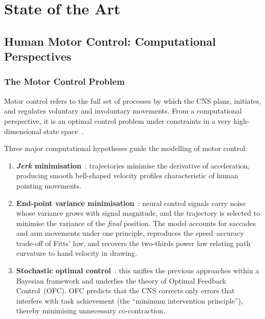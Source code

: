 \chapter{State of the Art}
\label{chap:sota}

\section{Human Motor Control: Computational Perspectives}

\subsection{The Motor Control Problem}

Motor control refers to the full set of processes by which the CNS plans,
initiates, and regulates voluntary and involuntary movements. From a computational
perspective, it is an optimal control problem under constraints in a very high-
dimensional state space~\parencite{Todorov2004, Scott2004}.

Three major computational hypotheses guide the modelling of motor control:
\begin{enumerate}
  \item \textbf{\textit{Jerk} minimisation}~\parencite{Flash1985}: trajectories
        minimise the derivative of acceleration, producing smooth bell-shaped
        velocity profiles characteristic of human pointing movements.
  \item \textbf{End-point variance minimisation}~\parencite{Harris1998}: neural
        control signals carry noise whose variance grows with signal magnitude,
        and the trajectory is selected to minimise the variance of the
        \emph{final} position. The model accounts for saccades and arm movements
        under one principle, reproduces the speed--accuracy trade-off of Fitts'
        law, and recovers the two-thirds power law relating path curvature to
        hand velocity in drawing.
  \item \textbf{Stochastic optimal control}~\parencite{Todorov2002}: this unifies
        the previous approaches within a Bayesian framework and underlies the theory
        of Optimal Feedback Control~(OFC). OFC predicts that the CNS corrects only
        errors that interfere with task achievement (the ``minimum intervention
        principle''), thereby minimising unnecessary co-contraction.
\end{enumerate}

